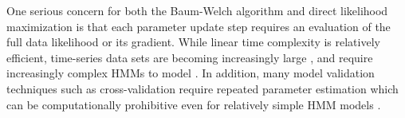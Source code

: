

One serious concern for both the Baum-Welch algorithm and direct likelihood maximization is that each parameter update step requires an evaluation of the full data likelihood or its gradient. 
While linear time complexity is relatively efficient, time-series data sets are becoming increasingly large \citep{Patterson:2017}, and require increasingly complex HMMs to model \citep{Adam:2019}. In addition, many model validation techniques such as cross-validation require repeated parameter estimation which can be computationally prohibitive even for relatively simple HMM models \citep{Pohle:2017}.


